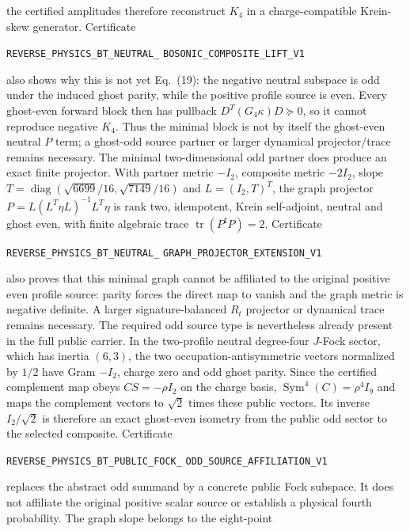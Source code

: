 \documentclass[11pt]{article}
\theoremstyle{definition}
\theoremstyle{remark}
\begin{document}
the certified amplitudes therefore reconstruct $K_4$ in a charge-compatible
Krein-skew generator.  Certificate
\par\noindent
\texttt{REVERSE\_PHYSICS\_BT\_NEUTRAL\_}\allowbreak
\texttt{BOSONIC\_COMPOSITE\_LIFT\_V1}
\par\noindent
also shows why this is not yet Eq.~(19): the negative neutral subspace is odd
under the induced ghost parity, while the positive profile source is even.
Every ghost-even forward block then has pullback
$D^T(G_4\kappa)D\succeq0$, so it cannot reproduce negative $K_4$.
Thus the minimal block is not by itself the ghost-even neutral $P$ term; a ghost-odd
source partner or larger dynamical projector/trace remains necessary.
The minimal two-dimensional odd partner does produce an exact finite
projector.  With partner metric $-I_2$, composite metric $-2I_2$, slope
$T=\operatorname{diag}(\sqrt{6699}/16,\sqrt{7149}/16)$ and
$L=(I_2,T)^T$, the graph projector
$P=L(L^T\eta L)^{-1}L^T\eta$ is rank two, idempotent, Krein self-adjoint,
neutral and ghost even, with finite algebraic trace
$\operatorname{tr}(P^\sharp P)=2$.  Certificate
\par\noindent
\texttt{REVERSE\_PHYSICS\_BT\_NEUTRAL\_}\allowbreak
\texttt{GRAPH\_PROJECTOR\_EXTENSION\_V1}
\par\noindent
also proves that this minimal graph cannot be affiliated to the original
positive even profile source: parity forces the direct map to vanish and
the graph metric is negative definite.  A larger signature-balanced
$R_t$ projector or dynamical trace remains necessary.
The required odd source type is nevertheless already present in the full
public carrier.  In the two-profile neutral degree-four $J$-Fock sector,
which has inertia $(6,3)$, the two occupation-antisymmetric vectors normalized
by $1/2$ have Gram $-I_2$, charge zero and odd ghost parity.  Since the
certified complement map obeys $CS=-\rho I_2$ on the charge basis,
$\operatorname{Sym}^4(C)=\rho^4I_9$ and maps the complement vectors to
$\sqrt2$ times these public vectors.  Its inverse $I_2/\sqrt2$ is therefore
an exact ghost-even isometry from the public odd sector to the selected
composite.  Certificate
\par\noindent
\texttt{REVERSE\_PHYSICS\_BT\_PUBLIC\_FOCK\_}
\allowbreak\texttt{ODD\_SOURCE\_AFFILIATION\_V1}
\par\noindent
replaces the abstract odd summand by a concrete public Fock subspace.  It
does not affiliate the original positive scalar source or establish a
physical fourth probability.  The graph slope belongs to the eight-point
\end{document}
